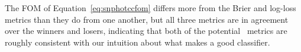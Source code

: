 The FOM of Equation~\ref{eq:snphotccfom} differs more from the Brier and log-loss metrics than they do from one another, but all three metrics are in agreement over the winners and losers, indicating that both of the potential \plasticc\ metrics are roughly consistent with our intuition about what makes a good classifier.

